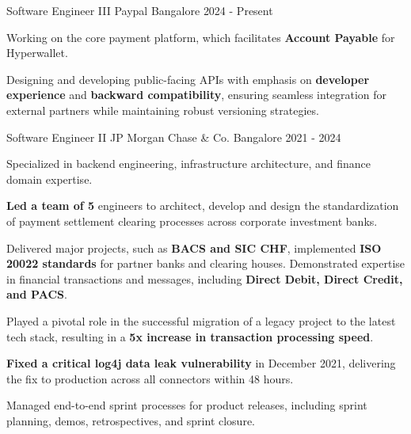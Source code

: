 
\begin{cventries}


  \cventry
    {Software Engineer III} %
    {Paypal} %
    {Bangalore} %
    {2024 - Present} %
    {
      \begin{cvitems} %
        \item {Working on the core payment platform, which facilitates {\textbf{Account Payable}} for Hyperwallet.}
        \item {Designing and developing public-facing APIs with emphasis on {\textbf{developer experience}} and {\textbf{backward compatibility}}, ensuring seamless integration for external partners while maintaining robust versioning strategies.}
      \end{cvitems}
    }

  \cventry
    {Software Engineer II} %
    {JP Morgan Chase \& Co.} %
    {Bangalore} %
    {2021 - 2024} %
    {
      \begin{cvitems} %
        \item {Specialized in backend engineering, infrastructure architecture, and finance domain expertise.}
        \item {\textbf{Led a team of 5} engineers to architect, develop and design the standardization of payment settlement clearing processes across corporate investment banks.}
        \item {Delivered major projects, such as \textbf{BACS and SIC CHF}, implemented \textbf{ISO 20022 standards} for partner banks and clearing houses. Demonstrated expertise in financial transactions and messages, including \textbf{Direct Debit, Direct Credit, and PACS}.}
        \item {Played a pivotal role in the successful migration of a legacy project to the latest tech stack, resulting in a \textbf{5x increase in transaction processing speed}.}
        \item {\textbf{Fixed a critical log4j data leak vulnerability} in December 2021, delivering the fix to production across all connectors within 48 hours.}
        \item {Managed end-to-end sprint processes for product releases, including sprint planning, demos, retrospectives, and sprint closure.}
      \end{cvitems}
    }


\end{cventries}
